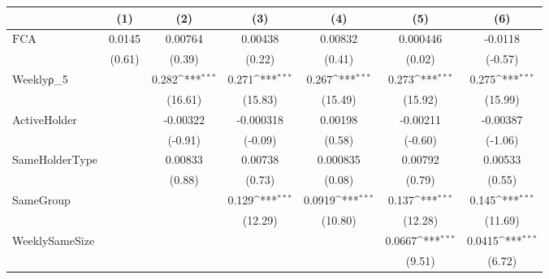 {
\def\sym#1{\ifmmode^{#1}\else\(^{#1}\)\fi}
\begin{tabular}{l*{6}{c}}
\hline\hline
                    &\multicolumn{1}{c}{(1)}         &\multicolumn{1}{c}{(2)}         &\multicolumn{1}{c}{(3)}         &\multicolumn{1}{c}{(4)}         &\multicolumn{1}{c}{(5)}         &\multicolumn{1}{c}{(6)}         \\
\hline
$ \text{FCA} $      &      0.0145         &     0.00764         &     0.00438         &     0.00832         &    0.000446         &     -0.0118         \\
                    &      (0.61)         &      (0.39)         &      (0.22)         &      (0.41)         &      (0.02)         &     (-0.57)         \\
[1em]
Weeklyρ\_5           &                     &       0.282\sym{***}&       0.271\sym{***}&       0.267\sym{***}&       0.273\sym{***}&       0.275\sym{***}\\
                    &                     &     (16.61)         &     (15.83)         &     (15.49)         &     (15.92)         &     (15.99)         \\
[1em]
ActiveHolder        &                     &    -0.00322         &   -0.000318         &     0.00198         &    -0.00211         &    -0.00387         \\
                    &                     &     (-0.91)         &     (-0.09)         &      (0.58)         &     (-0.60)         &     (-1.06)         \\
[1em]
SameHolderType      &                     &     0.00833         &     0.00738         &    0.000835         &     0.00792         &     0.00533         \\
                    &                     &      (0.88)         &      (0.73)         &      (0.08)         &      (0.79)         &      (0.55)         \\
[1em]
SameGroup           &                     &                     &       0.129\sym{***}&      0.0919\sym{***}&       0.137\sym{***}&       0.145\sym{***}\\
                    &                     &                     &     (12.29)         &     (10.80)         &     (12.28)         &     (11.69)         \\
[1em]
WeeklySameSize      &                     &                     &                     &                     &      0.0667\sym{***}&      0.0415\sym{***}\\
                    &                     &                     &                     &                     &      (9.51)         &      (6.72)         \\

\end{tabular}}
